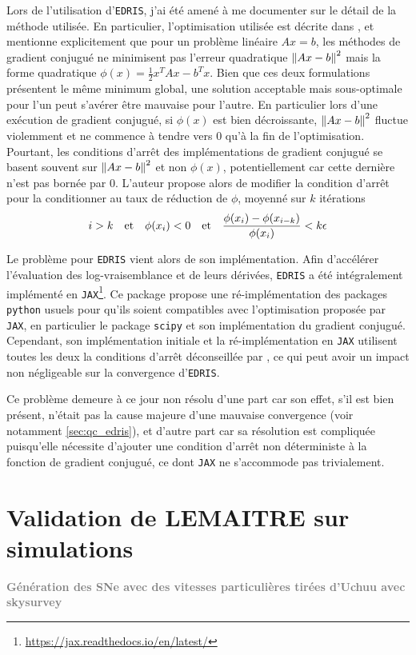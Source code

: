\documentclass{book}
\newcommand{\todo}[1]{{\textcolor{gray}{\bf \large #1}}}
\def\edris{\texttt{EDRIS}\xspace}
\begin{document}
Lors de l'utilisation d'\edris, j'ai été amené à me documenter sur le détail de la méthode utilisée. En particulier, l'optimisation utilisée est décrite dans \cite{martens_deep_2010}, et mentionne explicitement que pour un problème linéaire $Ax = b$, les méthodes de gradient conjugué ne minimisent pas l'erreur quadratique $\norm{Ax-b}^2$ mais la forme quadratique $\phi(x) = \frac{1}{2} x^T A x - b^T x$. Bien que ces deux formulations présentent le même minimum global, une solution acceptable mais sous-optimale pour l'un peut s'avérer être mauvaise pour l'autre. En particulier lors d'une exécution de gradient conjugué, si $\phi(x)$ est bien décroissante, $\norm{Ax-b}^2$ fluctue violemment et ne commence à tendre vers 0 qu'à la fin de l'optimisation. Pourtant, les conditions d'arrêt des implémentations de gradient conjugué se basent souvent sur $\norm{Ax-b}^2$ et non $\phi(x)$, potentiellement car cette dernière n'est pas bornée par 0. L'auteur propose alors de modifier la condition d'arrêt pour la conditionner au taux de réduction de $\phi$, moyenné sur $k$ itérations
\begin{equation}
	i > k \qq{et} \phi(x_i) < 0 \qq{et} \frac{\phi(x_i) - \phi(x_{i-k})}{\phi(x_i)} < k \epsilon
\end{equation}

Le problème pour \edris  vient alors de son implémentation. Afin d'accélérer l'évaluation des log-vraisemblance et de leurs dérivées, \edris a été intégralement implémenté en \texttt{JAX}\footnote{\href{https://jax.readthedocs.io/en/latest/}{https://jax.readthedocs.io/en/latest/}}. Ce package propose une ré-implémentation des packages \texttt{python} usuels pour qu'ils soient compatibles avec l'optimisation proposée par \texttt{JAX}, en particulier le package \texttt{scipy} et son implémentation du gradient conjugué. Cependant, son implémentation initiale et la ré-implémentation en \texttt{JAX} utilisent toutes les deux la conditions d'arrêt déconseillée par \cite{martens_deep_2010}, ce qui peut avoir un impact non négligeable sur la convergence d'\edris.

Ce problème demeure à ce jour non résolu d'une part car son effet, s'il est bien présent, n'était pas la cause majeure d'une mauvaise convergence (voir notamment \ref{sec:qc_edris}), et d'autre part car sa résolution est compliquée puisqu'elle nécessite d'ajouter une condition d'arrêt non déterministe à la fonction de gradient conjugué, ce dont \texttt{JAX} ne s’accommode pas trivialement.


\section{Validation de LEMAITRE sur simulations}
\todo{Génération des SNe avec des vitesses particulières tirées d'Uchuu avec skysurvey}
\end{document}

